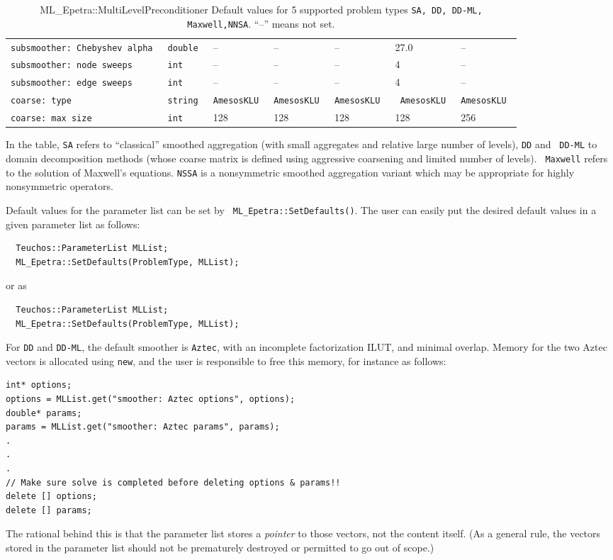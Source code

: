 \documentclass{article}[11pt]
\begin{document}
\begin{table}
\begin{tabular}{| p{6.5cm} | p{1.3cm} | p{2.5cm} | p{2.1cm} | p{2.1cm} | p{2.5cm} | p{2.2cm} |}
\tt subsmoother: Chebyshev alpha & \tt double & -- & -- & -- & 27.0 & -- \\
\tt subsmoother: node sweeps & \tt int & -- & -- & -- & 4 & -- \\
\tt subsmoother: edge sweeps & \tt int & -- & -- & -- & 4 & -- \\
\hline
\hline
\tt coarse: type & \tt string & \tt Amesos\-KLU & \tt Amesos\-KLU  & \tt Amesos\-KLU  & \tt
Amesos\-KLU & \tt Amesos\-KLU \\
\tt coarse: max size & \tt int & 128 & 128 & 128 & 128 & 256 \\
\hline
  \end{tabular}
  \caption{ML\_Epetra::MultiLevelPreconditioner Default values for
    5 supported problem types {\tt SA, DD, DD-ML, Maxwell,NNSA}. 
    ``--'' means not set.}
  \label{tab:default}
\end{table}
%
In the table, {\tt SA} refers to ``classical'' smoothed aggregation (with
small aggregates and relative large number of levels), {\tt DD} and {\tt
  DD-ML} to domain decomposition methods (whose coarse matrix is defined
using aggressive coarsening and limited number of levels).  {\tt
  Maxwell} refers to the solution of Maxwell's equations.  {\tt NSSA} 
is a nonsymmetric smoothed aggregation variant which may be appropriate for highly
nonsymmetric operators.

Default values for the parameter list can be set by {\tt
  ML\_Epetra::SetDefaults()}.  The user can easily put the desired
default values in a given parameter list as follows:
\begin{verbatim}
  Teuchos::ParameterList MLList;
  ML_Epetra::SetDefaults(ProblemType, MLList);
\end{verbatim}
or as
\begin{verbatim}
  Teuchos::ParameterList MLList;
  ML_Epetra::SetDefaults(ProblemType, MLList);
\end{verbatim}

For {\tt DD} and {\tt DD-ML}, the default smoother is {\tt Aztec},
with an incomplete factorization ILUT, and minimal overlap. 
Memory for the two {\sc Aztec} vectors is allocated using {\tt new}, and the
user is responsible to free this memory, for instance as follows:
\begin{verbatim}
int* options;
options = MLList.get("smoother: Aztec options", options);
double* params;
params = MLList.get("smoother: Aztec params", params);
.
.
.
// Make sure solve is completed before deleting options & params!!
delete [] options;
delete [] params;
\end{verbatim}
The rational behind this is that the parameter list stores a {\sl pointer} to those
vectors, not the content itself. (As a general rule, the vectors stored in the
parameter list should not
be prematurely destroyed or permitted to go out of scope.)
%
\end{document}
